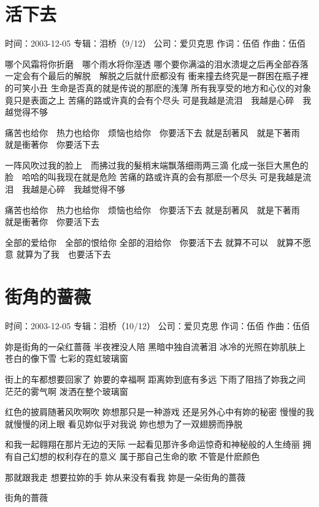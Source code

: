 \documentclass[UTF8,a4paper,oneside,twocolumn,12pt]{ctexbook}
\newcommand{\infopair}[2]{\textbullet #1：#2}
\newcommand{\zc}[1][伍佰]{\infopair{作词}{#1}}
\newcommand{\zq}[1][伍佰]{\infopair{作曲}{#1}}
\newcommand{\zj}[1]{\infopair{专辑}{#1}}
\newcommand{\sj}[1]{\infopair{时间}{#1}}
\newcommand{\gs}[1]{\infopair{公司}{#1}}
\newenvironment{info}{\begin{flushleft}\kaishu
	}
	{\end{flushleft}\normalsize\yahei\par}
\newenvironment{lyric}{
	}
{}
\begin{document}
\section{活下去}
\begin{info}
	\sj{2003-12-05}
	\zj{泪桥（9/12）}
	\gs{爱贝克思}
	\zc
	\zq
\end{info}
\begin{lyric}
	哪个风霜将你折磨　哪个雨水将你溼透
	哪个要你满溢的泪水溃堤之后再全部吞落
	一定会有个最后的解脱　解脱之后就什麽都没有
	衝来撞去终究是一群困在瓶子裡的可笑小丑
	生命是否真的就是传说的那麽的浅薄
	所有我享受的地方和心仪的对象　竟只是表面之上
	苦痛的路或许真的会有个尽头
	可是我越是流泪　我越是心碎　我越觉得不够

	痛苦也给你　热力也给你　烦恼也给你　你要活下去
	就是刮著风　就是下著雨　就是衝著你　你要活下去

	一阵风吹过我的脸上　而拂过我的髮梢末端飘落细雨两三滴
	化成一张巨大黑色的脸　哈哈的叫我现在就是危险
	苦痛的路或许真的会有那麽一个尽头
	可是我越是流泪　我越是心碎　我越觉得不够

	痛苦也给你　热力也给你　烦恼也给你　你要活下去
	就是刮著风　就是下著雨　就是衝著你　你要活下去

	全部的爱给你　全部的恨给你
	全部的泪给你　你要活下去
	就算不可以　就算不愿意
	就算为了我　也要活下去
\end{lyric}

\section{街角的蔷薇}
\begin{info}
	\sj{2003-12-05}
	\zj{泪桥（10/12）}
	\gs{爱贝克思}
	\zc
	\zq
\end{info}
\begin{lyric}
	妳是街角的一朵红蔷薇 半夜裡没人陪 黑暗中独自流著泪
	冰冷的光照在妳肌肤上 苍白的像下雪 七彩的霓虹玻璃窗

	街上的车都想要回家了 妳要的幸福啊 距离妳到底有多远
	下雨了阻挡了妳我之间 茫茫的雾气啊 泼洒在整个玻璃窗

	红色的披肩随著风吹啊吹 妳想那只是一种游戏 还是另外心中有妳的秘密
	慢慢的我就慢慢的闭上眼 看见妳似乎对我说 妳也想为了一双翅膀而挣脱

	和我一起翱翔在那片无边的天际 一起看见那许多命运惊奇和神秘般的人生绮丽
	拥有自己幻想的权利存在的意义 属于那自己生命的歌 不管是什麽颜色

	那就跟我走 想要拉妳的手
	妳从来没有看我
	妳是一朵街角的蔷薇

	街角的蔷薇
\end{lyric}
\end{document}
